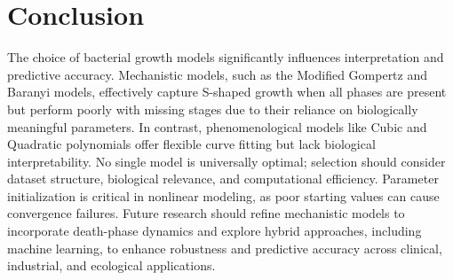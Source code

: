 \documentclass{article}
\begin{document}
\section{Conclusion}

The choice of bacterial growth models significantly influences interpretation and predictive accuracy. Mechanistic models, such as the Modified Gompertz and Baranyi models, effectively capture S-shaped growth when all phases are present but perform poorly with missing stages due to their reliance on biologically meaningful parameters. In contrast, phenomenological models like Cubic and Quadratic polynomials offer flexible curve fitting but lack biological interpretability. No single model is universally optimal; selection should consider dataset structure, biological relevance, and computational efficiency. Parameter initialization is critical in nonlinear modeling, as poor starting values can cause convergence failures. Future research should refine mechanistic models to incorporate death-phase dynamics and explore hybrid approaches, including machine learning, to enhance robustness and predictive accuracy across clinical, industrial, and ecological applications.





\newpage

 

\end{document}
